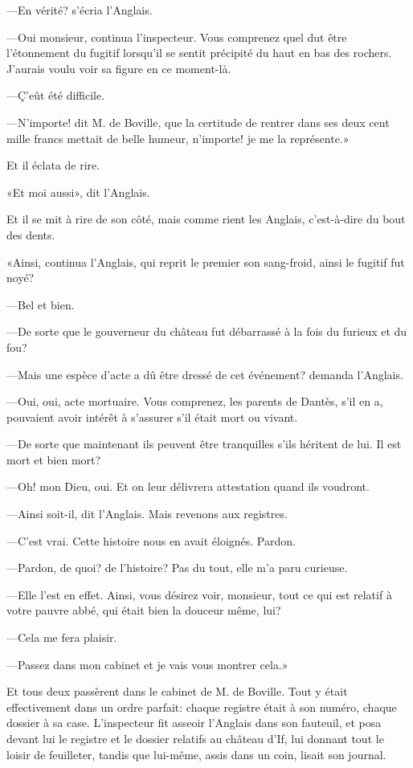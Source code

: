 —En vérité? s'écria l'Anglais.

—Oui monsieur, continua l'inspecteur. Vous comprenez quel dut être l'étonnement du fugitif lorsqu'il se sentit précipité du haut en bas des rochers. J'aurais voulu voir sa figure en ce moment-là.

—Ç'eût été difficile.

—N'importe! dit M. de Boville, que la certitude de rentrer dans ses deux cent mille francs mettait de belle humeur, n'importe! je me la représente.»

Et il éclata de rire.

«Et moi aussi», dit l'Anglais.

Et il se mit à rire de son côté, mais comme rient les Anglais, c'est-à-dire du bout des dents.

«Ainsi, continua l'Anglais, qui reprit le premier son sang-froid, ainsi le fugitif fut noyé?

—Bel et bien.

—De sorte que le gouverneur du château fut débarrassé à la fois du furieux et du fou?

—Mais une espèce d'acte a dû être dressé de cet événement? demanda l'Anglais.

—Oui, oui, acte mortuaire. Vous comprenez, les parents de Dantès, s'il en a, pouvaient avoir intérêt à s'assurer s'il était mort ou vivant.

—De sorte que maintenant ils peuvent être tranquilles s'ils héritent de lui. Il est mort et bien mort?

—Oh! mon Dieu, oui. Et on leur délivrera attestation quand ils voudront.

—Ainsi soit-il, dit l'Anglais. Mais revenons aux registres.

—C'est vrai. Cette histoire nous en avait éloignés. Pardon.

—Pardon, de quoi? de l'histoire? Pas du tout, elle m'a paru curieuse.

—Elle l'est en effet. Ainsi, vous désirez voir, monsieur, tout ce qui est relatif à votre pauvre abbé, qui était bien la douceur même, lui?

—Cela me fera plaisir.

—Passez dans mon cabinet et je vais vous montrer cela.»

Et tous deux passèrent dans le cabinet de M. de Boville. Tout y était effectivement dans un ordre parfait: chaque registre était à son numéro, chaque dossier à sa case. L'inspecteur fit asseoir l'Anglais dans son fauteuil, et posa devant lui le registre et le dossier relatifs au château d'If, lui donnant tout le loisir de feuilleter, tandis que lui-même, assis dans un coin, lisait son journal.

